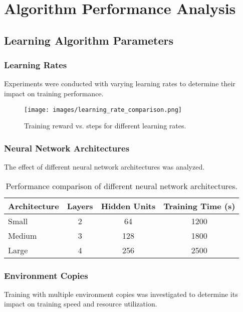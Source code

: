 \section{Algorithm Performance Analysis}

\subsection{Learning Algorithm Parameters}

\subsubsection{Learning Rates}
Experiments were conducted with varying learning rates to determine their impact on training performance.

\begin{figure}[h]
    \centering
    \texttt{[image: images/learning\_rate\_comparison.png]}
    \caption{Training reward vs. steps for different learning rates.}
    \label{fig:learning_rate}
\end{figure}

\subsubsection{Neural Network Architectures}
The effect of different neural network architectures was analyzed.

\begin{table}[h]
    \centering
    \caption{Performance comparison of different neural network architectures.}
    \begin{tabular}{lccc}
        \toprule
        Architecture & Layers & Hidden Units & Training Time (s) \\
        \midrule
        Small & 2 & 64 & 1200 \\
        Medium & 3 & 128 & 1800 \\
        Large & 4 & 256 & 2500 \\
        \bottomrule
    \end{tabular}
    \label{tab:nn_architectures}
\end{table}

\subsubsection{Environment Copies}
Training with multiple environment copies was investigated to determine its impact on training speed and resource utilization.

